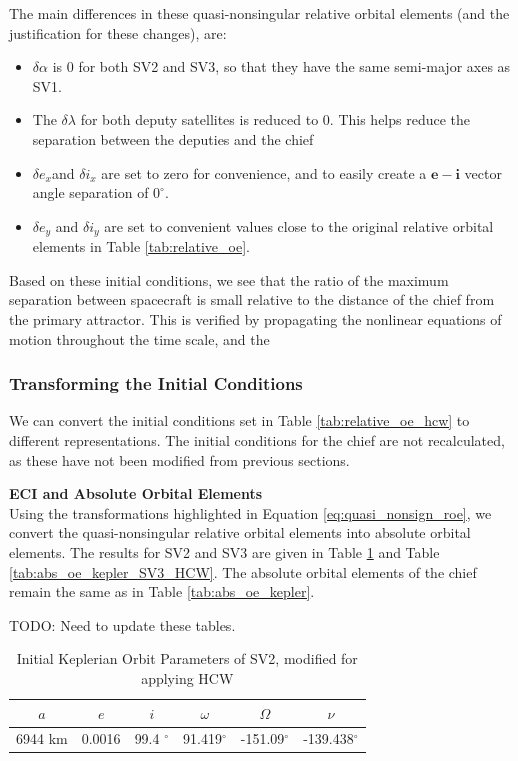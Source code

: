 The main differences in these quasi-nonsingular relative orbital elements (and the justification for these changes), are:
\begin{itemize}
    \item $\delta\alpha$ is 0 for both SV2 and SV3, so that they have the same semi-major axes as SV1.
    \item The $\delta\lambda$ for both deputy satellites is reduced to 0. This helps reduce the separation between the deputies and the chief
    \item $\delta e_x$and $\delta i_x$ are set to zero for convenience, and to easily create a $\boldsymbol{e}-\boldsymbol{i}$ vector angle separation of $0^\circ$.
    \item $\delta e_y$ and $\delta i_y$ are set to convenient values close to the original relative orbital elements in Table \ref{tab:relative_oe}.
\end{itemize}

Based on these initial conditions, we see that the ratio of the maximum separation between spacecraft is small relative to the distance of the chief from the primary attractor. This is verified by propagating the nonlinear equations of motion throughout the time scale, and the



\subsubsection{Transforming the Initial Conditions} \label{sec:hcw_initial_conditions}
We can convert the initial conditions set in Table \ref{tab:relative_oe_hcw} to different representations. The initial conditions for the chief are not recalculated, as these have not been modified from previous sections.

\textbf{ECI and Absolute Orbital Elements} \\
Using the transformations highlighted in Equation \ref{eq:quasi_nonsign_roe}, 
we convert the quasi-nonsingular relative orbital elements into absolute orbital elements. The results for SV2 and SV3 are given in Table \ref{tab:abs_oe_kepler_SV2_HCW} and Table \ref{tab:abs_oe_kepler_SV3_HCW}. The absolute orbital elements of the chief remain the same as in Table \ref{tab:abs_oe_kepler}.

TODO: Need to update these tables.

\begin{table}[h]
\centering
\begin{tabular}{cccccc} \hline
    $a$ & $e$ & $i$ & $\omega$ & $\Omega$ & $\nu$ \\ \hline 
     6944 km & 0.0016 & 99.4 $^\circ$ & 91.419$^\circ$ & -151.09$^\circ$ & -139.438$^\circ$ \\ \hline
\end{tabular}
\caption{Initial Keplerian Orbit Parameters of SV2, modified for applying HCW}
\label{tab:abs_oe_kepler_SV2_HCW}
\end{table}

